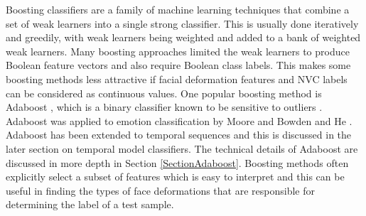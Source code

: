 Boosting classifiers are a family of machine learning techniques that combine a set of weak learners into a single strong classifier. This is usually done iteratively and greedily, with weak learners being weighted and added to a bank of weighted weak learners. Many boosting approaches limited the weak learners to produce Boolean feature vectors and also require Boolean class labels. This makes some boosting methods less attractive if facial deformation features and \ac{NVC} labels can be considered as continuous values. One popular boosting method is Adaboost \cite{Freund1996}, which is a binary classifier known to be sensitive to outliers \cite{Natsuki2008}. Adaboost was applied to emotion classification by Moore and Bowden \cite{Moore07} and He \etal \cite{He2005}. Adaboost has been extended to temporal sequences and this is discussed in the later section on temporal model classifiers. The technical details of Adaboost are discussed in more depth in Section \ref{SectionAdaboost}. Boosting methods often explicitly select a subset of features which is easy to interpret and this can be useful in finding the types of face deformations that are responsible for determining the label of a test sample.


